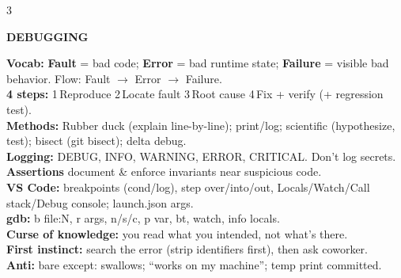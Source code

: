 \documentclass[10pt,letterpaper]{article}
\newenvironment{topic}[1]{%
  \par\addvspace{1.5pt}%
  \noindent\colorbox{hdrBG}{%
    \begin{minipage}{\dimexpr\linewidth-2\fboxsep\relax}%
      \centering\bfseries\sffamily\fontsize{6pt}{7pt}\selectfont\color{hdrFG}\MakeUppercase{#1}%
    \end{minipage}%
  }\par\nobreak\vskip0.5pt%
  \begingroup\setlength{\leftskip}{0pt}\setlength{\rightskip}{0pt}%
}{%
  \endgroup\par\addvspace{0.5pt}%
}
\newcommand{\warn}[1]{\textcolor{warnC}{\textbf{#1}}}
\newcommand{\hd}[1]{\textcolor{accent}{\textbf{#1}}}
\newcommand{\cn}[1]{{\ttfamily\small #1}}
\begin{document}
\begin{multicols*}{3}
\begin{topic}{Debugging}
\hd{Vocab:} \textbf{Fault} = bad code; \textbf{Error} = bad runtime state; \textbf{Failure} = visible bad behavior. Flow: Fault $\to$ Error $\to$ Failure.\\
\hd{4 steps:} 1\,Reproduce 2\,Locate fault 3\,Root cause 4\,Fix + verify (+ regression test).\\
\hd{Methods:} Rubber duck (explain line-by-line); print/log; scientific (hypothesize, test); bisect (\cn{git bisect}); delta debug.\\
\hd{Logging:} DEBUG, INFO, WARNING, ERROR, CRITICAL. Don't log secrets.\\
\hd{Assertions} document \& enforce invariants near suspicious code.\\
\hd{VS Code:} breakpoints (cond/log), step over/into/out, Locals/Watch/Call stack/Debug console; \cn{launch.json} args.\\
\hd{gdb:} \cn{b file:N}, \cn{r args}, \cn{n/s/c}, \cn{p var}, \cn{bt}, \cn{watch}, \cn{info locals}.\\
\hd{Curse of knowledge:} you read what you intended, not what's there.\\
\hd{First instinct:} search the error (strip identifiers first), then ask coworker.\\
\warn{Anti:} bare \cn{except:} swallows; ``works on my machine''; temp \cn{print} committed.
\end{topic}

\end{multicols*}

\newpage
\end{document}
